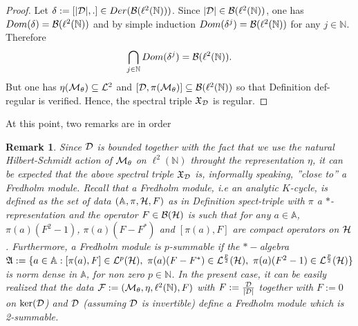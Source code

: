 \documentclass[10pt]{book}
\theoremstyle{break}
\newtheorem{remark}{Remark}
\begin{document}
\begin{proof}
Let $\delta:=[|{\cal{D}}|,.]\in Der({\cal{B}}(\ell^2(\mathbb{N}))) $. Since $|{\cal{D}}|\in{\cal{B}}(\ell^2(\mathbb{N}))$, one has $Dom(\delta)={\cal{B}}(\ell^2(\mathbb{N}))$ and by simple induction $Dom(\delta^j)={\cal{B}}(\ell^2(\mathbb{N}))$ for any $j\in\mathbb{N}$. Therefore
\begin{equation}
\bigcap_{j\in\mathbb{N}}Dom(\delta^j)={\cal{B}}(\ell^2(\mathbb{N})).
\end{equation}
But one has $\eta({\cal{M}}_\theta)\subseteq{\cal{L}}^2$ and $[{\cal{D}},\pi({\cal{M}}_\theta)]\subseteq{\cal{B}}(\ell^2(\mathbb{N}))$ so that Definition {def-regular} is verified. Hence, the spectral triple $\mathfrak{X}_{{\cal{D}}}$ is regular.
\end{proof}

\noindent At this point, two remarks are in order

\begin{remark}
Since ${\cal{D}}$ is bounded together with the fact that we use the natural Hilbert-Schmidt action of ${\cal{M}}_\theta$ on $\ell^2(\mathbb{N})$ throught the representation $\eta$, it can be expected that the above spectral triple $\mathfrak{X}_{{\cal{D}}}$ is, informally speaking, ''close to'' a Fredholm module. Recall that a Fredholm module, i.e an analytic $K$-cycle, is defined as the set of data $(\mathbb{A},\pi,{\cal{H}},F)$ as in Definition {spect-triple} with $\pi$ a $*$-representation and the operator $F\in{\cal{B}}({\cal{H}})$ is such that for any $a\in\mathbb{A}$, $\pi(a)(F^2-1)$, $\pi(a)(F-F^*)$ and $[\pi(a),F]$ are compact operators on ${\cal{H}}$. Furthermore, a Fredholm module is $p$-summable if the $*-$algebra $\mathfrak{A}:=\{a\in\mathbb{A}: [\pi(a),F]\in{\cal{L}}^p({\cal{H}}),\ \pi(a)(F-F^*)\in{\cal{L}}^{\frac{p}{2}}({\cal{H}}),\ \pi(a)(F^2-1)\in{\cal{L}}^{\frac{p}{2}}({\cal{H}})\}$ is norm dense in $\mathbb{A}$, for non zero $p\in\mathbb{N}$. In the present case, it can be easily realized that the data ${\cal{F}}:=({\cal{M}}_\theta,\eta,\ell^2(\mathbb{N}), F)$ with $F:=\frac{{\cal{D}}}{|{\cal{D}}|}$ together with $F:=0$ on $\ker({\cal{D}}$) and ${\cal{D}}$ (assuming ${\cal{D}}$ is invertible) define a Fredholm module which is 2-summable.
\end{remark}
\end{document}
